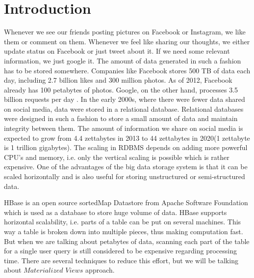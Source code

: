 \documentclass[11pt,a4paper,bibtotoc,idxtotoc,headsepline,footsepline,footexclude,BCOR12mm,DIV13]{scrbook}
\begin{document}
	\frontmatter
	
	
	
	
	
	
%	
	\clearemptydoublepage
	
	
	
	
	
	
	
	
	

	\tableofcontents
  

	\mainmatter
	
	



\chapter{Introduction}
\label{chap:introduction}

Whenever we see our friends posting pictures on Facebook or Instagram, we like them or comment on them. Whenever we feel like sharing our thoughts, we either update status on Facebook or just tweet about it. If we need some relevant information, we just google it. The amount of data generated in such a fashion has to be stored somewhere. Companies like Facebook stores 500 TB of data each day\cite{daniel:datastats}, including 2.7 billion likes and 300 million photos. As of 2012, Facebook already has 100 petabytes of photos\cite{daniel:datastats}. Google, on the other hand, processes 3.5 billion requests per day \cite{daniel:datastats}. In the early 2000s, where there were fewer data shared on social media, data were stored in a relational database. Relational databases were designed in such a fashion to store a small amount of data and maintain integrity between them\cite{matt:rdb}. The amount of information we share on social media is expected to grow from 4.4 zettabytes in 2013 to 44 zettabytes in 2020(1 zettabyte is 1 trillion gigabytes)\cite{matt:rdb}. The scaling in RDBMS depends on adding more powerful CPU's and memory, i.e. only the vertical scaling is possible which is rather expensive.  One of the advantages of the big data storage system is that it can be scaled horizontally and is also useful for storing unstructured or semi-structured data. 

HBase is an open source sortedMap Datastore from Apache Software Foundation which is used as a database to store huge volume of data. HBase supports horizontal scalability, i.e. parts of a table can be put on several machines. This way a table is broken down into multiple pieces, thus making computation fast. But when we are talking about petabytes of data, scanning each part of the table for a single user query is still considered to be expensive regarding processing time. There are several techniques to reduce this effort, but we will be talking about $Materialized$ $Views$ approach. 
\end{document}
